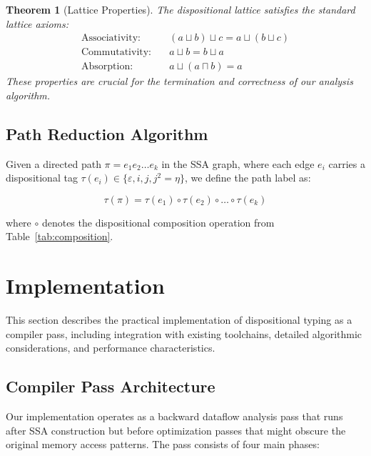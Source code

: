\documentclass[acmsmall,anonymous,review,screen]{acmart}
\newtheorem{theorem}{Theorem}
\begin{document}
	\begin{theorem}[Lattice Properties]
		The dispositional lattice satisfies the standard lattice axioms:
		\begin{align}
			\text{Associativity:} \quad &(a \sqcup b) \sqcup c = a \sqcup (b \sqcup c) \\
			\text{Commutativity:} \quad &a \sqcup b = b \sqcup a \\
			\text{Absorption:} \quad &a \sqcup (a \sqcap b) = a
		\end{align}
		These properties are crucial for the termination and correctness of our analysis algorithm.
	\end{theorem}
	
	\subsection{Path Reduction Algorithm}
	
	Given a directed path $\pi = e_1e_2 \ldots e_k$ in the SSA graph, where each edge $e_i$ carries a dispositional tag $\tau(e_i) \in \{\varepsilon, i, j, j^{2} = \eta\}$, we define the path label as:
	
	\begin{equation}
		\tau(\pi) = \tau(e_1) \circ \tau(e_2) \circ \ldots \circ \tau(e_k)
	\end{equation}
	
	where $\circ$ denotes the dispositional composition operation from Table~\ref{tab:composition}.
	
	
	\section{Implementation}
	\label{sec:implementation}
	
	This section describes the practical implementation of dispositional typing as a compiler pass, including integration with existing toolchains, detailed algorithmic considerations, and performance characteristics.
	
	\subsection{Compiler Pass Architecture}
	
	Our implementation operates as a backward dataflow analysis pass that runs after SSA construction but before optimization passes that might obscure the original memory access patterns. The pass consists of four main phases:
	
\end{document}
